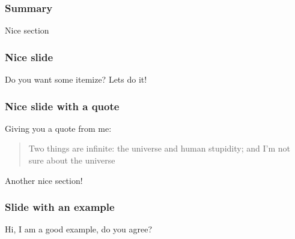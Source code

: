 \documentclass[handout,xcolor=dvipsnames,aspectratio=169]{beamer}
\begin{document}
{




\begin{frame}[t] %
\frametitle{Summary}
\tableofcontents
\end{frame}


\begin{section}{Nice section}
\begin{frame}[t]
\frametitle{Nice slide}
Do you want some itemize? Lets do it!
\begin{itemize}
\end{itemize}
\end{frame}

\begin{frame}[t]
\frametitle{Nice slide with a quote}
Giving you a quote from me:
\begin{quote}
\textcolor{RedEurac}{Two things are infinite: the universe and human stupidity; and I'm not sure about the universe} %
\end{quote} 
\end{frame}
\end{section}

\begin{section}{Another nice section!}
\begin{frame}[t]
\frametitle{Slide with an example}
\begin{example}
Hi, I am a good example, do you agree?
\end{example}
\end{frame}


\end{section}}
\end{document}
